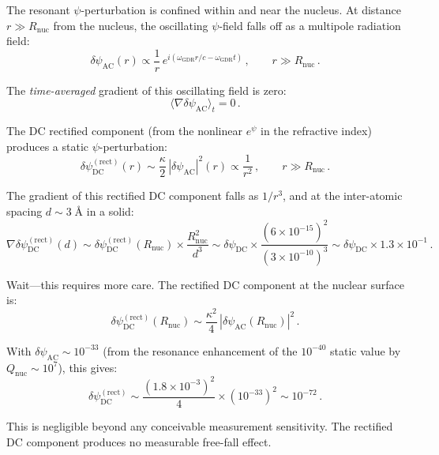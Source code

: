 \documentclass[aps,prd,twocolumn,superscriptaddress,nofootinbib]{revtex4-2}
\newcommand{\ee}[1]{\times 10^{#1}}
\newcommand{\kap}{\kappa}
\newcommand{\dpsi}{\delta\psi}
\newcommand{\Qnuc}{Q_{\mathrm{nuc}}}
\newcommand{\wGDR}{\omega_{\mathrm{GDR}}}
\newcommand{\Rnuc}{R_{\mathrm{nuc}}}
\begin{document}
The resonant $\psi$-perturbation is confined within and near the
nucleus.  At distance $r \gg \Rnuc$ from the nucleus, the oscillating
$\psi$-field falls off as a multipole radiation field:
\begin{equation}
\delta\psi_{\mathrm{AC}}(r) \propto \frac{1}{r}\,
e^{i(\wGDR r/c - \wGDR t)}\,,\qquad r \gg \Rnuc\,.
\end{equation}

The \emph{time-averaged} gradient of this oscillating field is zero:
\begin{equation}
\langle\nabla\delta\psi_{\mathrm{AC}}\rangle_t = 0\,.
\end{equation}

The DC rectified component (from the nonlinear $e^\psi$ in the
refractive index) produces a static $\psi$-perturbation:
\begin{equation}
\dpsi_{\mathrm{DC}}^{(\mathrm{rect})}(r)
\sim \frac{\kap}{2}\,|\delta\psi_{\mathrm{AC}}|^2(r)
\propto \frac{1}{r^2}\,,\qquad r \gg \Rnuc\,.
\end{equation}

The gradient of this rectified DC component falls as $1/r^3$, and
at the inter-atomic spacing $d \sim 3\;\text{\AA}$ in a solid:
\begin{equation}
\nabla\dpsi_{\mathrm{DC}}^{(\mathrm{rect})}(d)
\sim \dpsi_{\mathrm{DC}}^{(\mathrm{rect})}(\Rnuc)
\times \frac{\Rnuc^2}{d^3}
\sim \dpsi_{\mathrm{DC}} \times \frac{(6\ee{-15})^2}{(3\ee{-10})^3}
\sim \dpsi_{\mathrm{DC}} \times 1.3\ee{-1}\,.
\end{equation}

Wait---this requires more care.  The rectified DC component at
the nuclear surface is:
\begin{equation}
\dpsi_{\mathrm{DC}}^{(\mathrm{rect})}(\Rnuc) \sim
\frac{\kap^2}{4}\,|\delta\psi_{\mathrm{AC}}(\Rnuc)|^2\,.
\end{equation}

With $\delta\psi_{\mathrm{AC}} \sim 10^{-33}$ (from the resonance
enhancement of the $10^{-40}$ static value by $\Qnuc \sim 10^7$),
this gives:
\begin{equation}
\dpsi_{\mathrm{DC}}^{(\mathrm{rect})} \sim
\frac{(1.8\ee{-3})^2}{4} \times (10^{-33})^2 \sim 10^{-72}\,.
\end{equation}

This is negligible beyond any conceivable measurement sensitivity.
The rectified DC component produces no measurable free-fall effect.
\end{document}
